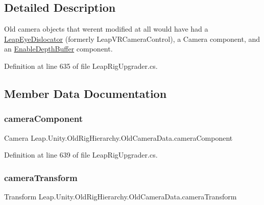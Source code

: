 \subsection{Detailed Description}
Old camera objects that weren\textquotesingle{}t modified at all would have had a \mbox{\hyperlink{class_leap_1_1_unity_1_1_leap_eye_dislocator}{Leap\+Eye\+Dislocator}} (formerly Leap\+V\+R\+Camera\+Control), a Camera component, and an \mbox{\hyperlink{class_leap_1_1_unity_1_1_enable_depth_buffer}{Enable\+Depth\+Buffer}} component. 



Definition at line 635 of file Leap\+Rig\+Upgrader.\+cs.



\subsection{Member Data Documentation}
\mbox{\label{class_leap_1_1_unity_1_1_old_rig_hierarchy_1_1_old_camera_data_a064374ed9ef4561816be21780153877f}} 
\subsubsection{\texorpdfstring{cameraComponent}{cameraComponent}}
{\footnotesize\ttfamily Camera Leap.\+Unity.\+Old\+Rig\+Hierarchy.\+Old\+Camera\+Data.\+camera\+Component}



Definition at line 639 of file Leap\+Rig\+Upgrader.\+cs.

\mbox{\label{class_leap_1_1_unity_1_1_old_rig_hierarchy_1_1_old_camera_data_a14376c67e293af5af3bb537ead0db3c4}} 
\subsubsection{\texorpdfstring{cameraTransform}{cameraTransform}}
{\footnotesize\ttfamily Transform Leap.\+Unity.\+Old\+Rig\+Hierarchy.\+Old\+Camera\+Data.\+camera\+Transform}



